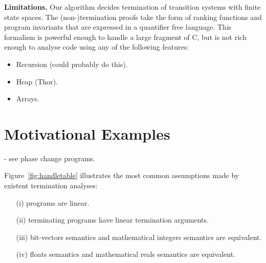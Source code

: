 \documentclass[preprint]{sigplanconf}
\theoremstyle{definition}
\begin{document}





{\bf Limitations.}
Our algorithm decides termination of transition systems with finite state spaces.
The (non-)termination proofs take the form of ranking functions and program invariants
that are expressed in a quantifier free language.  This formalism is powerful
enough to handle a large fragment of C, but is not rich enough to analyse
code using any of the following features:

\begin{itemize}
\item Recursion (could probably do this).
\item Heap (Thor).
\item Arrays.
\end{itemize}




\section{Motivational Examples} \label{sec:motivation}
- see phase change programs.

Figure~\ref{fig:handletable} illustrates the most common assumptions made by existent termination analyses:
\begin{itemize}
\item[(i)] programs are linear.
\item[(ii)] terminating programs have linear termination arguments.
\item[(iii)] bit-vectors semantics and mathematical integers semantics are equivalent.
\item[(iv)] floats semantics and mathematical reals semantics are equivalent.
\end{itemize}  
\end{document}

